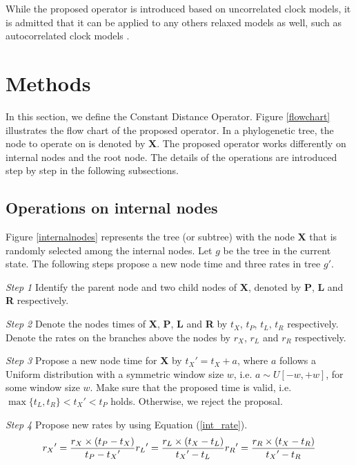 \documentclass{bmcart}
\begin{document}
While the proposed operator is introduced based on uncorrelated clock models, it is admitted that it can be applied to any others relaxed models as well, such as autocorrelated clock models \cite{thorne1998estimating}.

\section*{Methods}
In this section, we define the Constant Distance Operator. Figure \ref{flowchart} illustrates the flow chart of the proposed operator. In a phylogenetic tree, the node to operate on is denoted by \textbf{X}. The proposed operator works differently on internal nodes and the root node. The details of the operations are introduced step by step in the following subsections.
\subsection*{Operations on internal nodes}
Figure \ref{internalnodes} represents the tree (or subtree) with the node \textbf{X} that is randomly selected among the internal nodes. Let $g$ be the tree in the current state. The following steps propose a new node time and three rates in tree ${g}'$.

\emph{Step 1} Identify the parent node and two child nodes of \textbf{X}, denoted by \textbf{P}, \textbf{L} and \textbf{R} respectively.

\emph{Step 2} Denote the nodes times of \textbf{X}, \textbf{P}, \textbf{L} and \textbf{R} by $t_X$, $t_P$, $t_L$, $t_R$ respectively. Denote the rates on the branches above the nodes by $r_X$, $r_L$ and $r_R$ respectively.

\emph{Step 3} Propose a new node time for \textbf{X} by ${t_X}' = {t_X} + a$, where $a$ follows a Uniform distribution with a symmetric window size $w$, i.e. $a \sim U[ - w, + w]$, for some window size $w$. Make sure that the proposed time is valid, i.e. $\max \{ {t_L},{t_R}\}  < {t_X}' < {t_P}$ holds. Otherwise, we reject the proposal.

\emph{Step 4} Propose new rates by using Equation (\ref{int_rate}).
\begin{equation}
 \label{int_rate}
{r_X}' = \frac{{r_X} \times ({{t_P} - {t_X}})}{{{t_P} - {t_X}'}}\\
{r_L}' = \frac{{{r_L} \times ({{t_X} - {t_L}})}}{{{t_X}' - {t_L}}}\\
{r_R}' = \frac{{{r_R} \times ({{t_X} - {t_R}})}}{{{t_X}' - {t_R}}}
 \end{equation}
\end{document}
